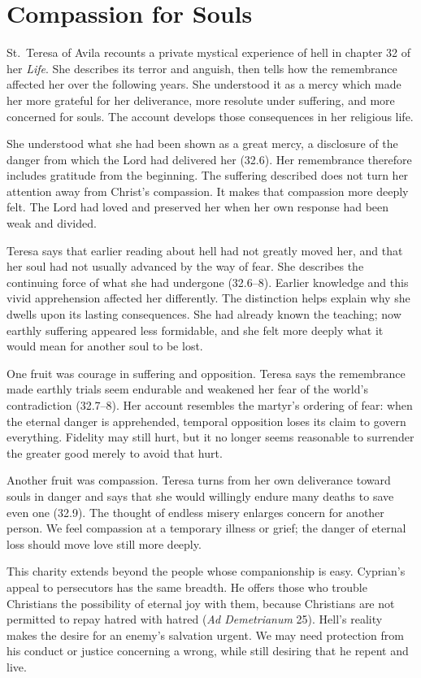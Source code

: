 \section{Compassion for Souls}

St.~Teresa of Avila recounts a private mystical experience of hell in chapter 32 of her \emph{Life}. She describes its terror and anguish, then tells how the remembrance affected her over the following years. She understood it as a mercy which made her more grateful for her deliverance, more resolute under suffering, and more concerned for souls. The account develops those consequences in her religious life.

She understood what she had been shown as a great mercy, a disclosure of the danger from which the Lord had delivered her (32.6). Her remembrance therefore includes gratitude from the beginning. The suffering described does not turn her attention away from Christ's compassion. It makes that compassion more deeply felt. The Lord had loved and preserved her when her own response had been weak and divided.

Teresa says that earlier reading about hell had not greatly moved her, and that her soul had not usually advanced by the way of fear. She describes the continuing force of what she had undergone (32.6--8). Earlier knowledge and this vivid apprehension affected her differently. The distinction helps explain why she dwells upon its lasting consequences. She had already known the teaching; now earthly suffering appeared less formidable, and she felt more deeply what it would mean for another soul to be lost.

One fruit was courage in suffering and opposition. Teresa says the remembrance made earthly trials seem endurable and weakened her fear of the world's contradiction (32.7--8). Her account resembles the martyr's ordering of fear: when the eternal danger is apprehended, temporal opposition loses its claim to govern everything. Fidelity may still hurt, but it no longer seems reasonable to surrender the greater good merely to avoid that hurt.

Another fruit was compassion. Teresa turns from her own deliverance toward souls in danger and says that she would willingly endure many deaths to save even one (32.9). The thought of endless misery enlarges concern for another person. We feel compassion at a temporary illness or grief; the danger of eternal loss should move love still more deeply.

This charity extends beyond the people whose companionship is easy. Cyprian's appeal to persecutors has the same breadth. He offers those who trouble Christians the possibility of eternal joy with them, because Christians are not permitted to repay hatred with hatred (\emph{Ad Demetrianum} 25). Hell's reality makes the desire for an enemy's salvation urgent. We may need protection from his conduct or justice concerning a wrong, while still desiring that he repent and live.

